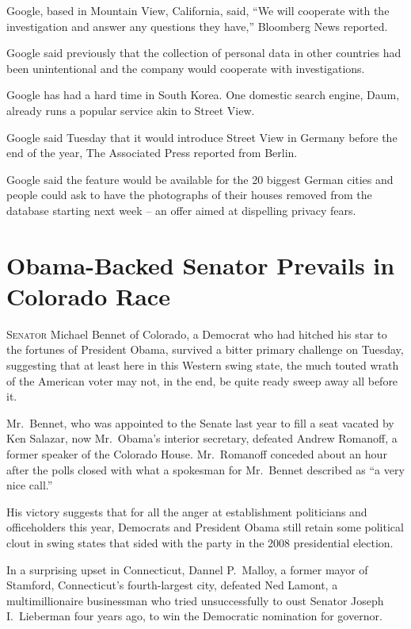 ﻿\documentclass[12pt]{article}
\begin{document}
Google, based in Mountain View, California, said, ``We will cooperate with the investigation and
answer any questions they have,'' Bloomberg News reported.

Google said previously that the collection of personal data in other countries had been
unintentional and the company would cooperate with investigations.

Google has had a hard time in South Korea. One domestic search engine, Daum, already runs a popular
service akin to Street View.

Google said Tuesday that it would introduce Street View in Germany before the end of the year, The
Associated Press reported from Berlin.

Google said the feature would be available for the 20 biggest German cities and people could ask to
have the photographs of their houses removed from the database starting next week -- an offer aimed
at dispelling privacy fears.

\section{Obama-Backed Senator Prevails in Colorado Race}

\lettrine{S}{enator} Michael Bennet of Colorado, a Democrat who had hitched
his star to the fortunes of President Obama, survived a bitter primary challenge on Tuesday,
suggesting that at least here in this Western swing state, the much touted wrath of the American
voter may not, in the end, be quite ready sweep away all before it.

Mr.~Bennet, who was appointed to the Senate last year to fill a seat vacated by Ken Salazar, now
Mr.~Obama's interior secretary, defeated Andrew Romanoff, a former speaker of the Colorado House.
Mr.~Romanoff conceded about an hour after the polls closed with what a spokesman for Mr.~Bennet
described as ``a very nice call.''

His victory suggests that for all the anger at establishment politicians and officeholders this
year, Democrats and President Obama still retain some political clout in swing states that sided
with the party in the 2008 presidential election.

In a surprising upset in Connecticut, Dannel P.~Malloy, a former mayor of Stamford, Connecticut's
fourth-largest city, defeated Ned Lamont, a multimillionaire businessman who tried unsuccessfully to
oust Senator Joseph I.~Lieberman four years ago, to win the Democratic nomination for governor.
\end{document}
